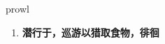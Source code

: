 
\begin{frame}
{\huge prowl}
\begin{center}
\begin{enumerate}\Large
  \item \textbf{潜行于，巡游以猎取食物，徘徊}
\end{enumerate}
\end{center}
\end{frame}
